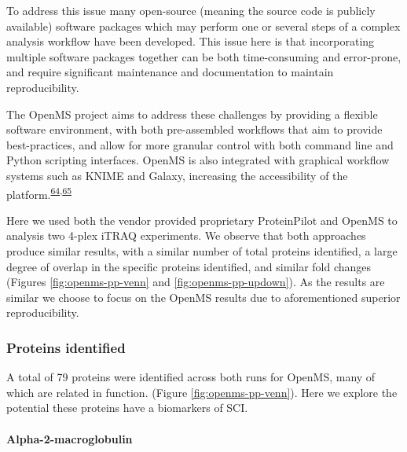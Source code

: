 \documentclass[
]{article}
\begin{document}
To address this issue many open-source (meaning the source code is publicly available) software packages which may perform one or several steps of a complex analysis workflow have been developed.
This issue here is that incorporating multiple software packages together can be both time-consuming and error-prone, and require significant maintenance and documentation to maintain reproducibility.

The OpenMS project aims to address these challenges by providing a flexible software environment, with both pre-assembled workflows that aim to provide best-practices, and allow for more granular control with both command line and Python scripting interfaces.
OpenMS is also integrated with graphical workflow systems such as KNIME and Galaxy, increasing the accessibility of the platform.\textsuperscript{\protect\hyperlink{ref-berthold_knime_2009}{64},\protect\hyperlink{ref-goecks_galaxy_2010}{65}}

Here we used both the vendor provided proprietary ProteinPilot and OpenMS to analysis two 4-plex iTRAQ experiments.
We observe that both approaches produce similar results, with a similar number of total proteins identified, a large degree of overlap in the specific proteins identified, and similar fold changes (Figures \ref{fig:openms-pp-venn} and \ref{fig:openms-pp-updown}).
As the results are similar we choose to focus on the OpenMS results due to aforementioned superior reproducibility.

\hypertarget{proteins-identified}{%
\subsubsection{Proteins identified}\label{proteins-identified}}

A total of 79 proteins were identified across both runs for OpenMS, many of which are related in function. (Figure \ref{fig:openms-pp-venn}).
Here we explore the potential these proteins have a biomarkers of SCI.

\hypertarget{alpha-2-macroglobulin}{%
\paragraph{Alpha-2-macroglobulin}\label{alpha-2-macroglobulin}}
\end{document}

